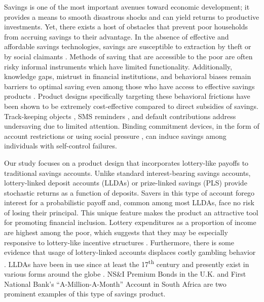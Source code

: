 \documentclass[12pt]{article}
\begin{document}
	Savings is one of the most important avenues toward economic development; it provides a means to smooth disastrous shocks and can yield returns to productive investments. Yet, there exists a host of obstacles that prevent poor households from accruing savings to their advantage. In the absence of effective and affordable savings technologies, savings are susceptible to extraction by theft or by social claimants . Methods of saving that are accessible to the poor are often risky informal instruments which have limited functionality. Additionally, knowledge gaps, mistrust in financial institutions, and behavioral biases remain barriers to optimal saving even among those who have access to effective savings products . Product designs specifically targeting these behavioral frictions have been shown to be extremely cost-effective compared to direct subsidies of savings. Track-keeping objects , SMS reminders , and default contributions  address undersaving due to limited attention. Binding commitment devices, in the form of account restrictions  or using social pressure , can induce savings among individuals with self-control failures.


	Our study focuses on a product design that incorporates lottery-like payoffs to traditional savings accounts. Unlike standard interest-bearing savings accounts, lottery-linked deposit accounts (LLDAs) or prize-linked savings (PLS) provide stochastic returns as a function of deposits. Savers in this type of account forego interest for a probabilistic payoff and, common among most LLDAs, face no risk of losing their principal. This unique feature makes the product an attractive tool for promoting financial inclusion. Lottery expenditures as a proportion of income are highest among the poor, which suggests that they may be especially responsive to lottery-like incentive structures . Furthermore, there is some evidence that usage of lottery-linked accounts displaces costly gambling behavior . LLDAs have been in use since at least the 17\textsuperscript{th} century and presently exist in various forms around the globe . NS\&I Premium Bonds in the U.K. and First National Bank's ``A-Million-A-Month'' Account in South Africa are two prominent examples of this type of savings product.
\end{document}
